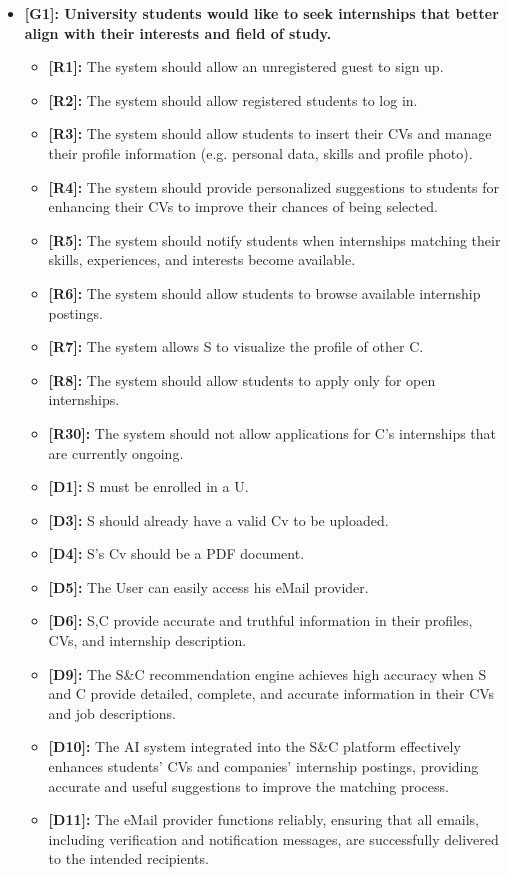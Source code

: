 \begin{itemize}
\item
  \textbf{[G1]: University students would like to seek internships
  that better align with their interests and field of study.}

  \begin{itemize}
  \item
    \textbf{[R1]:} The system should allow an unregistered guest to sign up.
  \item
    \textbf{[R2]:} The system should allow registered students to log in.
  \item
    \textbf{[R3]:} The system should allow students to insert their CVs and
    manage their profile information (e.g. personal data, skills and
    profile photo).
  \item
    \textbf{[R4]:} The system should provide personalized suggestions to
    students for enhancing their CVs to improve their chances of being
    selected.
  \item
    \textbf{[R5]:} The system should notify students when internships
    matching their skills, experiences, and interests become available.
  \item
    \textbf{[R6]:} The system should allow students to browse available
    internship postings.
  \item
    \textbf{[R7]:} The system allows S to visualize the profile of other C.
  \item
    \textbf{[R8]:} The system should allow students to apply only for open internships.
  \item
    \textbf{[R30]:} The system should not allow applications for C’s internships that are currently ongoing.
  \item
    \textbf{[D1]:} S must be enrolled in a U.
  \item
    \textbf{[D3]:} S should already have a valid Cv to be uploaded.
  \item
    \textbf{[D4]:} S's Cv should be a PDF document.
  \item
    \textbf{[D5]:} The User can easily access his eMail provider.
  \item
    \textbf{[D6]:} S,C provide accurate and truthful information in their
    profiles, CVs, and internship description.
  \item
    \textbf{[D9]:} The S\&C recommendation engine achieves high accuracy when
    S and C provide detailed, complete, and accurate information in
    their CVs and job descriptions.
  \item
    \textbf{[D10]:} The AI system integrated into the S\&C platform
    effectively enhances students' CVs and
    companies' internship postings, providing accurate
    and useful suggestions to improve the matching process.
  \item
    \textbf{[D11]:} The eMail provider functions reliably, ensuring that all
    emails, including verification and notification messages, are
    successfully delivered to the intended recipients.
  \end{itemize}
\end{itemize}

